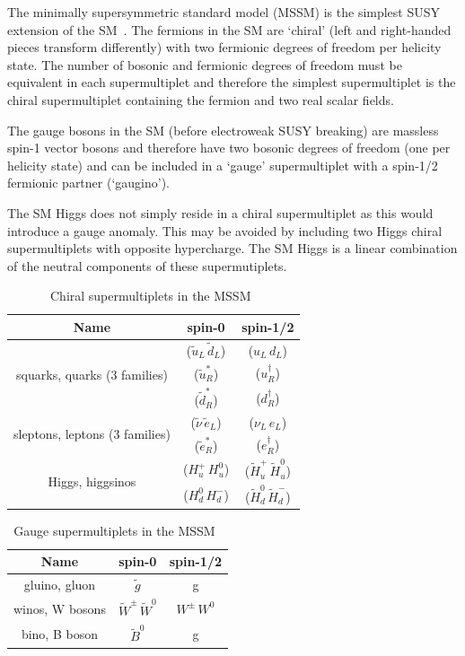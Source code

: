 The minimally supersymmetric standard model (MSSM) is the simplest SUSY extension of the SM~\cite{SUSYP}.
The fermions in the SM are `chiral' (left and right-handed pieces transform differently)
with two fermionic degrees of freedom per helicity state. The number of bosonic and fermionic degrees 
of freedom must be equivalent in each supermultiplet and therefore the simplest supermultiplet
is the chiral supermultiplet containing the fermion and two real scalar fields.

The gauge bosons in the SM (before electroweak SUSY breaking) are massless spin-1 vector bosons
and therefore have two bosonic degrees of freedom (one per helicity state) and
can be included in a `gauge' supermultiplet with a spin-1/2 fermionic partner (`gaugino').

The SM Higgs does not simply reside in a chiral supermultiplet as this would introduce a 
gauge anomaly. This may be avoided by including two Higgs chiral supermultiplets with 
opposite hypercharge. The SM Higgs is a linear combination of the neutral components 
of these supermutiplets.

\begin{table}[!h]
  \centering
  \caption{Chiral supermultiplets in the MSSM~\cite{SUSYP}}
  \label{tab:chiral}
  \begin{tabular}
    {ccc}
    \hline\hline
    Name& spin-0 & spin-1/2 \\
    \hline
    \multirow{3}{*}{squarks, quarks (3 families) }& ($\tilde{u}_L\,\tilde{d}_L$) & ($u_L\,d_L$) \\
    & ($\tilde{u}^{*}_R$) & ($u_R^{\dagger}$) \\
    & ($\tilde{d}^{*}_R$) & ($d_R^{\dagger}$) \\
    \hline
    \multirow{2}{*}{sleptons, leptons (3 families) }& ($\tilde{\nu}\,\tilde{e}_L$) & ($\nu_L\,e_L$) \\
    & ($\tilde{e}^{*}_R$) & ($e_R^{\dagger}$) \\
    \hline
    \multirow{2}{*}{Higgs, higgsinos}& ($H_u^{+}\,H_u^{0}$) &  ($\tilde{H}_u^{+}\,\tilde{H}_u^{0}$) \\
    & ($H_d^{0}\,H_d^{-}$) &  ($\tilde{H}_d^{0}\,\tilde{H}_d^{-}$) \\
  \end{tabular}
\end{table}

\begin{table}[!h]
  \centering
  \caption{Gauge supermultiplets in the MSSM~\cite{SUSYP}}
  \label{tab:vector}
  \begin{tabular}
    {ccc}
    \hline\hline
    Name& spin-0 & spin-1/2 \\
    \hline
    gluino, gluon & $\tilde{g}$ & g \\
    winos, W bosons & $\tilde{W}^{\pm}\,\tilde{W}^0$ & $W^{\pm}\,W^{0}$ \\
    bino, B boson & $\tilde{B}^0$ & g \\
  \end{tabular}
\end{table}

